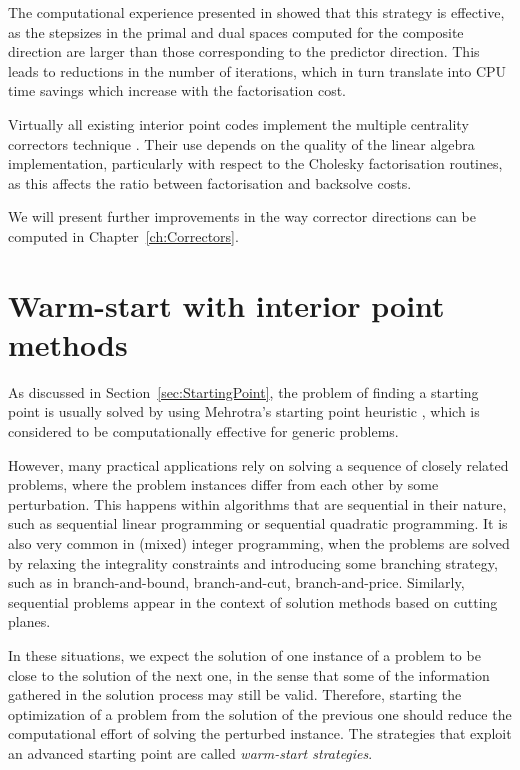 The computational experience presented in \cite{Gondzio96} showed 
that this strategy is effective, as the stepsizes in the primal and 
dual spaces computed for the composite direction are larger than 
those corresponding to the predictor direction. 
This leads to reductions in the number of iterations, which in turn 
translate into CPU time savings which increase with the factorisation
cost.

Virtually all existing interior point codes implement the multiple
centrality correctors technique
\cite[Appendix B]{ipm:Wright97}.
Their use depends on the quality of the linear algebra implementation,
particularly with respect to the Cholesky factorisation routines,
as this affects the ratio between factorisation and backsolve costs.

We will present further improvements in the way corrector directions
can be computed in Chapter~\ref{ch:Correctors}.


%
%
\section{Warm-start with interior point methods}
\label{sec:WarmStart}

As discussed in Section~\ref{sec:StartingPoint}, the problem of 
finding a starting point is usually solved by using 
Mehrotra's starting point heuristic \cite{Mehrotra92}, which is 
considered to be computationally effective for generic problems.

However, many practical applications rely on solving a sequence 
of closely related problems, where the problem instances differ 
from each other by some 
perturbation. This happens within algorithms that are sequential 
in their nature, such as sequential linear programming or
sequential quadratic programming.
It is also very common in (mixed) integer programming, when the
problems are solved by relaxing the integrality constraints and
introducing some branching strategy, such as in branch-and-bound,
branch-and-cut, branch-and-price.
Similarly, sequential problems appear in the context of solution 
methods based on cutting planes.

In these situations, we expect the solution of one instance of a problem to be 
close to the solution of the next one, in the sense that some of
the information gathered in the solution process may still be valid. 
Therefore, starting the 
optimization of a problem from the solution of the previous one
should reduce the computational effort of solving the perturbed instance.
The strategies that exploit an advanced starting point are called
{\em warm-start strategies}.

